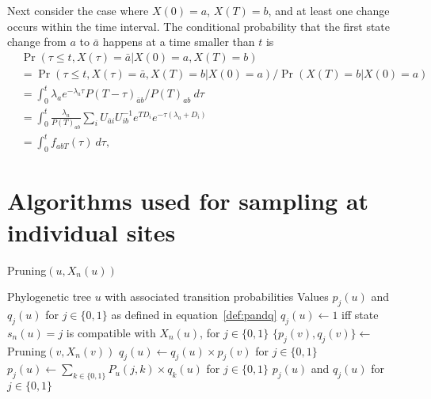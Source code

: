 \documentclass[11pt]{article}
\newcommand{\child}[1]{\ensuremath{\mathrm{child}(#1)}}
\begin{document}
Next consider the case where $X(0) = a$, $X(T) = b$, and at least one
change occurs within the time interval. The conditional probability
that the first state change from $a$ to $\bar{a}$ happens at a time
smaller than $t$ is
\begin{equation}
\begin{aligned}
&\Pr(\tau \le t, X(\tau) = \bar{a} | X(0) = a, X(T) = b) \\
&= \Pr(\tau \le t, X(\tau) = \bar{a}, X(T) = b| X(0) = a) / \Pr(X(T) = b | X(0) = a) \\
&= \int_{0}^{t} \lambda_ae^{-\lambda_a\tau}P(T-\tau)_{\bar{a}b}/ P(T)_{ab} ~ d\tau \\
&= \int_{0}^{t}\frac{\lambda_a}{P(T)_{ab}}\sum\limits_{i} U_{\bar{a}i}U_{ib}^{-1} e^{TD_i}e^{-\tau(\lambda_a+D_i)} \\
& = \int_{0}^{t} f_{abT}(\tau) ~d\tau,
\end{aligned}
\end{equation}


\clearpage

\section{Algorithms used for sampling at individual sites}

\begin{algorithm}[h!]
  \begin{algorithmic}[1]
    \caption{Pruning$(u, X_n(u))$}\label{alg:bottomup}
    \REQUIRE Phylogenetic tree $u$ with associated transition probabilities
    \ENSURE Values $p_j(u)$ and $q_j(u)$ for $j\in \{0, 1\}$ as defined in equation~\eqref{def:pandq}
    \STATE $q_j(u) \gets 1$ iff state $s_n(u) = j$ is compatible with $X_n(u)$, for $j\in \{0,1\}$
    \STATE $\{p_j(v), q_j(v)\} \gets$ Pruning$(v, X_n(v))$
    \STATE $q_j(u) \gets q_j(u) \times p_{j}(v)$ for $j\in \{0,1\}$
    \ENDFOR
    \STATE $p_j(u) \gets \sum_{k\in\{0,1\}} P_u(j, k) \times q_k(u)$ for $j\in\{0,1\}$
    \RETURN $p_j(u)$ and $q_j(u)$ for $j\in\{0,1\}$
  \end{algorithmic}
\end{algorithm}

\end{document}
